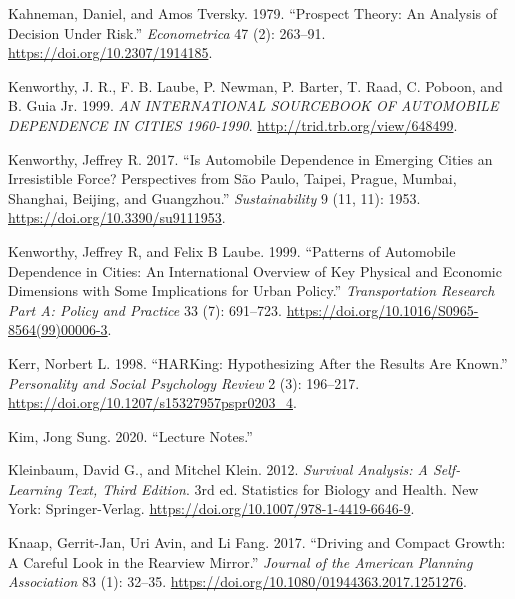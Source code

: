 \documentclass[
  11pt,
  openany]{memoir}
\newlength{\cslhangindent}
\newlength{\cslentryspacingunit} %
\newenvironment{CSLReferences}[2] %
 {%
  \setlength{\parindent}{0pt}
  \ifodd #1
  \let\oldpar\par
  \def\par{\hangindent=\cslhangindent\oldpar}
  \fi
  \setlength{\parskip}{#2\cslentryspacingunit}
 }%
 {}
\begin{document}
\begin{CSLReferences}{1}{0}
\leavevmode{}%
Kahneman, Daniel, and Amos Tversky. 1979. {``Prospect {Theory}: An {Analysis} of {Decision} Under {Risk}.''} \emph{Econometrica} 47 (2): 263--91. \url{https://doi.org/10.2307/1914185}.

\leavevmode{}%
Kenworthy, J. R., F. B. Laube, P. Newman, P. Barter, T. Raad, C. Poboon, and B. Guia Jr. 1999. \emph{{AN INTERNATIONAL SOURCEBOOK OF AUTOMOBILE DEPENDENCE IN CITIES} 1960-1990}. \url{http://trid.trb.org/view/648499}.

\leavevmode{}%
Kenworthy, Jeffrey R. 2017. {``Is {Automobile Dependence} in {Emerging Cities} an {Irresistible Force}? Perspectives from {São Paulo}, {Taipei}, {Prague}, {Mumbai}, {Shanghai}, {Beijing}, and {Guangzhou}.''} \emph{Sustainability} 9 (11, 11): 1953. \url{https://doi.org/10.3390/su9111953}.

\leavevmode{}%
Kenworthy, Jeffrey R, and Felix B Laube. 1999. {``Patterns of Automobile Dependence in Cities: An International Overview of Key Physical and Economic Dimensions with Some Implications for Urban Policy.''} \emph{Transportation Research Part A: Policy and Practice} 33 (7): 691--723. \url{https://doi.org/10.1016/S0965-8564(99)00006-3}.

\leavevmode{}%
Kerr, Norbert L. 1998. {``{HARKing}: Hypothesizing {After} the {Results} Are {Known}.''} \emph{Personality and Social Psychology Review} 2 (3): 196--217. \url{https://doi.org/10.1207/s15327957pspr0203_4}.

\leavevmode{}%
Kim, Jong Sung. 2020. {``Lecture {Notes}.''}

\leavevmode{}%
Kleinbaum, David G., and Mitchel Klein. 2012. \emph{Survival {Analysis}: A {Self}-{Learning Text}, {Third Edition}}. 3rd ed. Statistics for {Biology} and {Health}. {New York}: {Springer-Verlag}. \url{https://doi.org/10.1007/978-1-4419-6646-9}.

\leavevmode{}%
Knaap, Gerrit-Jan, Uri Avin, and Li Fang. 2017. {``Driving and {Compact Growth}: A {Careful Look} in the {Rearview Mirror}.''} \emph{Journal of the American Planning Association} 83 (1): 32--35. \url{https://doi.org/10.1080/01944363.2017.1251276}.


\end{CSLReferences}
\end{document}
